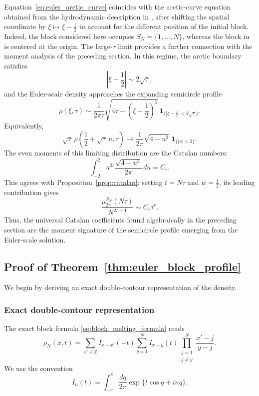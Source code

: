 \documentclass[11pt]{article}
\numberwithin{equation}{section}
\newcommand{\1}{\mathbf 1}
\begin{document}
Equation~\eqref{eq:euler_arctic_curve} coincides with the arctic-curve
equation obtained from the hydrodynamic description in
\cite{ZahraDubailSchutz2025}, after shifting the spatial coordinate by
\(\xi\mapsto\xi-\frac12\) to account for the different position of the
initial block.  Indeed, the block considered here occupies
\(S_N=\{1,\ldots,N\}\), whereas the block in
\cite{ZahraDubailSchutz2025} is centered at the origin.  The large-\(\tau\)
limit provides a further connection with the moment analysis of the
preceding section.  In this regime, the arctic boundary satisfies
\[
    \left|\xi-\frac12\right|\sim 2\sqrt{\tau},
\]
and the Euler-scale density approaches the expanding semicircle profile
\[
    \rho(\xi,\tau)
    \sim
    \frac{1}{2\pi\tau}
    \sqrt{4\tau-\left(\xi-\frac12\right)^2}\,
    \mathbf 1_{\{|\xi-\frac12|<2\sqrt{\tau}\}}.
\]
Equivalently,
\[
    \sqrt{\tau}\,
    \rho\left(\frac12+\sqrt{\tau}\,u,\tau\right)
    \longrightarrow
    \frac{1}{2\pi}\sqrt{4-u^2}\,
    \mathbf 1_{\{|u|<2\}}.
\]
The even moments of this limiting distribution are the Catalan numbers:
\[
    \int_{-2}^{2}
    u^{2r}\frac{\sqrt{4-u^2}}{2\pi}\,du
    =C_r.
\]
This agrees with Proposition~\ref{prop:catalan}: setting \(t=N\tau\) and
\(w=\frac12\), its leading contribution gives
\[
    \frac{\mu_{2r}^{S_N}(N\tau)}{N^{2r+1}}
    \sim C_r\tau^r.
\]
Thus, the universal Catalan coefficients found algebraically in the
preceding section are the moment signature of the semicircle profile
emerging from the Euler-scale solution.


\subsection{Proof of Theorem~\ref{thm:euler_block_profile}}
\label{subsec:euler_block_profile_proof}

We begin by deriving an exact double-contour representation of the density.

\subsubsection{Exact double-contour representation}

The exact block formula \eqref{eq:block_melting_formula} reads
\begin{equation}
    \rho_N(x,t)
    =
    \sum_{x'\in\mathbb Z} I_{x-x'}(-t)
    \sum_{y=1}^{N} I_{x-y}(t)
    \prod_{\substack{j=1\\ j\neq y}}^{N}
    \frac{x'-j}{y-j}.
    \label{eq:euler_starting_block_formula}
\end{equation}
We use the convention
\begin{equation}
    I_n(t)
    =
    \int_{-\pi}^{\pi}\frac{dq}{2\pi}
    \exp\{t\cos q+inq\}.
    \label{eq:euler_bessel_convention}
\end{equation}
\end{document}

